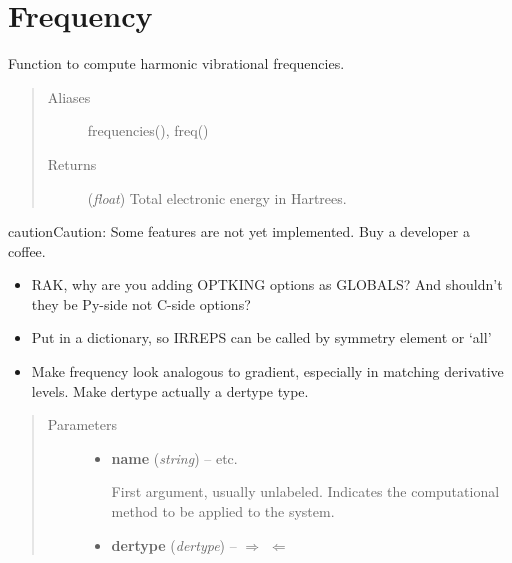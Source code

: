 \documentclass[letterpaper,10pt,english]{sphinxmanual}
\begin{document}
\chapter{Frequency}
\label{index:frequency}

\begin{fulllineitems}
\label{index:driver.frequency}
Function to compute harmonic vibrational frequencies.
\begin{quote}\begin{description}
\item[{Aliases }] \leavevmode
frequencies(), freq()

\item[{Returns}] \leavevmode
(\emph{float}) Total electronic energy in Hartrees.

\end{description}\end{quote}

\begin{notice}{caution}{Caution:}
Some features are not yet implemented. Buy a developer a coffee.
\begin{itemize}
\item {} 
RAK, why are you adding OPTKING options as GLOBALS? And shouldn't they be Py-side not C-side options?

\item {} 
Put in a dictionary, so IRREPS can be called by symmetry element or `all'

\item {} 
Make frequency look analogous to gradient, especially in matching derivative levels. Make dertype actually a dertype type.

\end{itemize}
\end{notice}
\begin{quote}\begin{description}
\item[{Parameters}] \leavevmode\begin{itemize}
\item {} 
\textbf{name} (\emph{string}) -- 
 \textbar{}\textbar{}  \textbar{}\textbar{}  \textbar{}\textbar{} etc.

First argument, usually unlabeled. Indicates the computational method
to be applied to the system.


\item {} 
\textbf{dertype} (\emph{dertype}) -- 
$\Rightarrow$  $\Leftarrow$ \textbar{}\textbar{}  \textbar{}\textbar{} 


\end{itemize}
\end{description}
\end{quote}
\end{fulllineitems}
\end{document}
